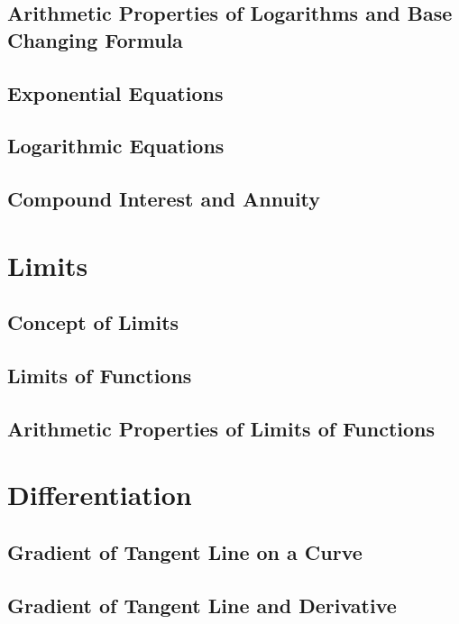 \documentclass{report}
\begin{document}
\section{Arithmetic Properties of Logarithms and Base Changing Formula}

\section{Exponential Equations}

\section{Logarithmic Equations}

\section{Compound Interest and Annuity}

\chapter{Limits}

\section{Concept of Limits}

\section{Limits of Functions}

\section{Arithmetic Properties of Limits of Functions}

\chapter{Differentiation}

\section{Gradient of Tangent Line on a Curve}

\section{Gradient of Tangent Line and Derivative}
\end{document}
